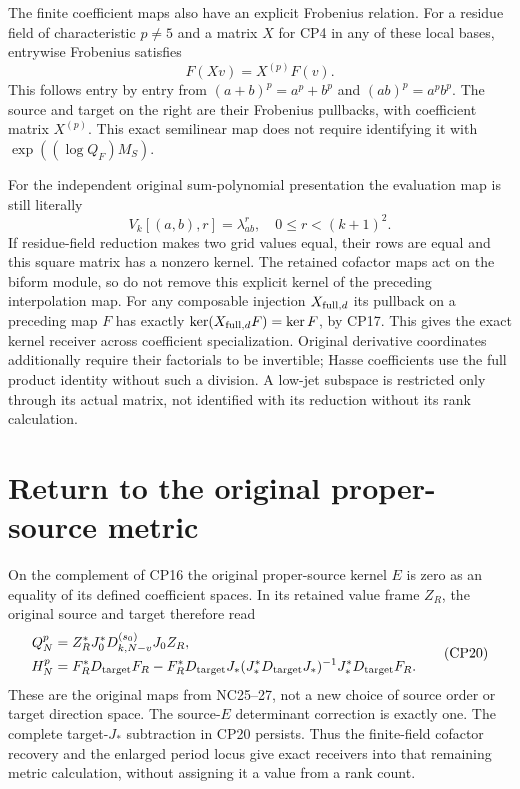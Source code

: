 \documentclass[11pt]{article}
\begin{document}
The finite coefficient maps also have an explicit Frobenius relation.
For a residue field of characteristic $p\ne5$ and a matrix $X$
for CP4 in any of these local bases, entrywise Frobenius satisfies
\[
 F(Xv)=X^{(p)}F(v).                                               \tag{CP18}
\]
This follows entry by entry from $(a+b)^p=a^p+b^p$ and
$(ab)^p=a^pb^p$. The source and target on the right are their
Frobenius pullbacks, with coefficient matrix $X^{(p)}$.
This exact semilinear map does not require identifying it with
$\exp((\log Q_F)M_S)$.

For the independent original sum-polynomial presentation the
evaluation map is still literally
\[
 V_k[(a,b),r]=\lambda_{ab}^{r},\quad0\le r<(k+1)^2.              \tag{CP19}
\]
If residue-field reduction makes two grid values equal, their rows
are equal and this square matrix has a nonzero kernel. The retained
cofactor maps act on the biform module, so do not remove this
explicit kernel of the preceding interpolation map. For any
composable injection $X_{{\rm full},d}$ its pullback on a preceding
map $F$ has exactly $\ker(X_{{\rm full},d}F)=\ker F$, by CP17.
This gives the exact kernel receiver across coefficient specialization.
Original derivative coordinates additionally require their factorials
to be invertible; Hasse coefficients use the full product identity
without such a division. A low-jet subspace is restricted only through
its actual matrix, not identified with its reduction without its
rank calculation.

\section{Return to the original proper-source metric}
On the complement of CP16 the original proper-source kernel $E$ is
zero as an equality of its defined coefficient spaces. In its retained
value frame $Z_R$, the original source and target therefore read
\[
 \begin{split}
 Q_N^p&=Z_R^*J_0^*D_{k,N-v}^{(s_0)}J_0Z_R,\\
 H_N^p&=F_R^*D_{\rm target}F_R
  -F_R^*D_{\rm target}J_*
   (J_*^*D_{\rm target}J_*)^{-1}J_*^*D_{\rm target}F_R.
 \end{split}                                                       \tag{CP20}
\]
These are the original maps from NC25--27, not a new choice of
source order or target direction space. The source-$E$ determinant
correction is exactly one. The complete target-$J_*$ subtraction
in CP20 persists. Thus the finite-field cofactor recovery and the
enlarged period locus give exact receivers into that remaining
metric calculation, without assigning it a value from a rank count.
\end{document}
